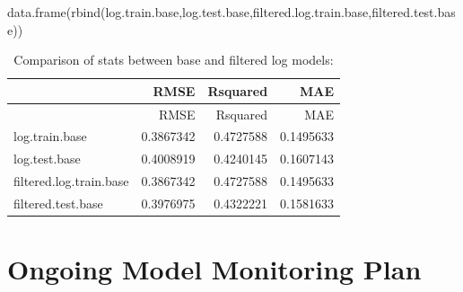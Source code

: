 \documentclass[
  letterpaper,
  DIV=11,
  numbers=noendperiod]{scrartcl}
\newenvironment{Shaded}{\begin{snugshade}}{\end{snugshade}}
\newcommand{\AttributeTok}[1]{\textcolor[rgb]{0.40,0.45,0.13}{#1}}
\newcommand{\CommentTok}[1]{\textcolor[rgb]{0.37,0.37,0.37}{#1}}
\newcommand{\DecValTok}[1]{\textcolor[rgb]{0.68,0.00,0.00}{#1}}
\newcommand{\FunctionTok}[1]{\textcolor[rgb]{0.28,0.35,0.67}{#1}}
\newcommand{\NormalTok}[1]{\textcolor[rgb]{0.00,0.23,0.31}{#1}}
\newcommand{\OtherTok}[1]{\textcolor[rgb]{0.00,0.23,0.31}{#1}}
\newcommand{\SpecialCharTok}[1]{\textcolor[rgb]{0.37,0.37,0.37}{#1}}
\newcommand{\StringTok}[1]{\textcolor[rgb]{0.13,0.47,0.30}{#1}}
\begin{document}
\begin{Shaded}
\end{Shaded}

\begin{Shaded}
\begin{Highlighting}[]
\FunctionTok{data.frame}\NormalTok{(}\FunctionTok{rbind}\NormalTok{(log.train.base,log.test.base,filtered.log.train.base,filtered.test.base))}
\end{Highlighting}
\end{Shaded}

\begin{longtable}[]{@{}lrrr@{}}
\caption{Comparison of stats between base and filtered log
models:}\tabularnewline
\toprule\noalign{}
& RMSE & Rsquared & MAE \\
\midrule\noalign{}
\endfirsthead
\toprule\noalign{}
& RMSE & Rsquared & MAE \\
\midrule\noalign{}
\endhead
\bottomrule\noalign{}
\endlastfoot
log.train.base & 0.3867342 & 0.4727588 & 0.1495633 \\
log.test.base & 0.4008919 & 0.4240145 & 0.1607143 \\
filtered.log.train.base & 0.3867342 & 0.4727588 & 0.1495633 \\
filtered.test.base & 0.3976975 & 0.4322221 & 0.1581633 \\
\end{longtable}

\section{Ongoing Model Monitoring
Plan}\label{ongoing-model-monitoring-plan}
\end{document}
